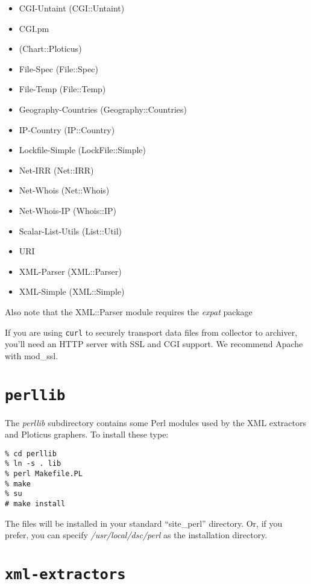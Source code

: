 \documentclass{report}
\begin{document}
\begin{itemize}
	\item CGI-Untaint (CGI::Untaint)
	\item CGI.pm
	\item (Chart::Ploticus)
	\item File-Spec (File::Spec)
	\item File-Temp (File::Temp)
	\item Geography-Countries (Geography::Countries)
	\item IP-Country (IP::Country)
	\item Lockfile-Simple (LockFile::Simple)
	\item Net-IRR (Net::IRR)
	\item Net-Whois (Net::Whois)
	\item Net-Whois-IP (Whois::IP)
	\item Scalar-List-Utils (List::Util)
	\item URI
	\item XML-Parser (XML::Parser)
	\item XML-Simple (XML::Simple)
\end{itemize}

\noindent
Also note that the XML::Parser module requires the {\em expat\/} package

If you are using {\tt curl\/} to securely transport data files from
collector to archiver, you'll need an HTTP server with SSL and CGI support.
We recommend Apache with mod\_ssl.

\section{\tt perllib}

The {\em perllib\/} subdirectory contains some Perl modules
used by the XML extractors and Ploticus graphers.  To install
these type:

\begin{verbatim}
% cd perllib
% ln -s . lib
% perl Makefile.PL
% make
% su
# make install
\end{verbatim}

\noindent
The files will be installed in your standard ``site\_perl'' directory.
Or, if you prefer, you can specify {\em /usr/local/dsc/perl\/}
as the installation directory.

\section{\tt xml-extractors}
\end{document}
